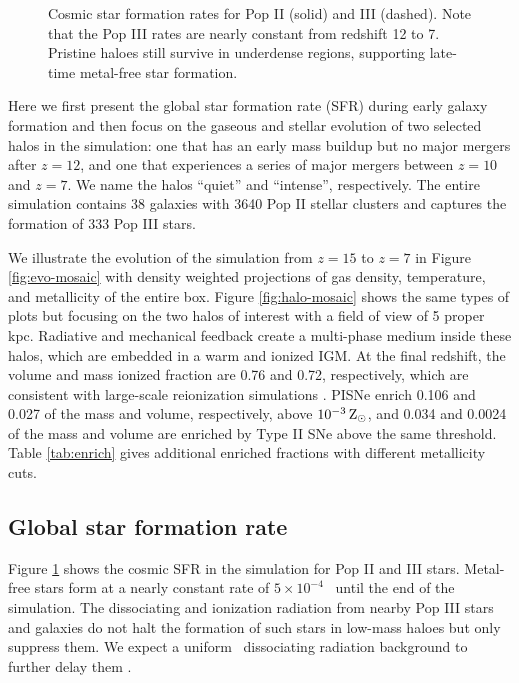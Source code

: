 \documentclass[apjl]{emulateapj}
\begin{document}
\begin{figure}
\caption{\label{fig:sfr} Cosmic star formation rates for Pop II
  (solid) and III (dashed).  Note that the Pop III rates are nearly
  constant from redshift 12 to 7.  Pristine haloes still survive in
  underdense regions, supporting late-time metal-free star formation.}
\end{figure}


Here we first present the global star formation rate (SFR) during
early galaxy formation and then focus on the gaseous and stellar
evolution of two selected halos in the simulation: one that has an
early mass buildup but no major mergers after $z=12$, and one that
experiences a series of major mergers between $z=10$ and $z=7$.  We
name the halos ``quiet'' and ``intense'', respectively.  The entire
simulation contains 38 galaxies with 3640 Pop II stellar clusters and
captures the formation of 333 Pop III stars.

We illustrate the evolution of the simulation from $z=15$ to $z=7$ in
Figure \ref{fig:evo-mosaic} with density weighted projections of gas
density, temperature, and metallicity of the entire box.  Figure
\ref{fig:halo-mosaic} shows the same types of plots but focusing on
the two halos of interest with a field of view of 5 proper kpc.
Radiative and mechanical feedback create a multi-phase medium inside
these halos, which are embedded in a warm and ionized IGM.  At the
final redshift, the volume and mass ionized fraction are 0.76 and
0.72, respectively, which are consistent with large-scale reionization
simulations \citep{Zahn11}.  PISNe enrich 0.106 and 0.027 of the mass
and volume, respectively, above $10^{-3} {\rm\,Z_\odot}$, and 0.034 and 0.0024
of the mass and volume are enriched by Type II SNe above the same
threshold.  Table \ref{tab:enrich} gives additional enriched fractions
with different metallicity cuts.

\subsection{Global star formation rate}

Figure \ref{fig:sfr} shows the cosmic SFR in the simulation for Pop II
and III stars.  Metal-free stars form at a nearly constant rate of $5
\times 10^{-4}$ \sfr~until the end of the simulation.  The
dissociating and ionization radiation from nearby Pop III stars and
galaxies do not halt the formation of such stars in low-mass haloes
but only suppress them.  We expect a uniform \hh~dissociating
radiation background to further delay them \citep{Machacek01, Wise07,
  OShea08}.
\end{document}
